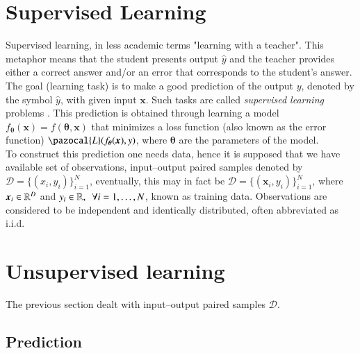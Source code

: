 \section{Supervised Learning}
Supervised learning, in less academic terms "learning with a teacher". This metaphor means that the student presents output $\widehat{y}$ and the teacher provides either a correct answer and/or an error that corresponds to the student's answer.  The goal (learning task) is to make a good prediction of the output $y$, denoted by the symbol $\hat{y}$, with given input $\boldsymbol{x}$. Such tasks are called \emph{supervised learning} problems \cite{supervised}. This prediction is obtained through learning a model $f_{\boldsymbol{\theta}}\left(\boldsymbol{x}\right) = f\left(\boldsymbol{\theta}, \boldsymbol{x}\right)$ that minimizes a loss function (also known as the error function) $\pazocal{L}(f_{\boldsymbol{\theta}}(\boldsymbol{x}), y)$, where $\boldsymbol{\theta}$ are the parameters of the model. \\
To construct this prediction one needs data, hence it is supposed that we have available set of observations, input--output paired samples denoted by $\mathcal{D} = \lbrace \left(x_i , y_i \right)\rbrace_{i=1}^N$, eventually, this may in fact be $\mathcal{D} = \lbrace\left( \boldsymbol{x}_i , y_i \right)\rbrace_{i=1}^N$, where $\boldsymbol{x}_i \in \mathbb{R}^D$ and $y_i \in \mathbb{R},~~\forall i = 1,\dots,N$, known as training data.  Observations are considered to be independent and identically distributed, often abbreviated as i.i.d. 

\section{Unsupervised learning}
The previous section dealt with input--output paired samples $\mathcal{D}$. 
\subsection{Prediction}

